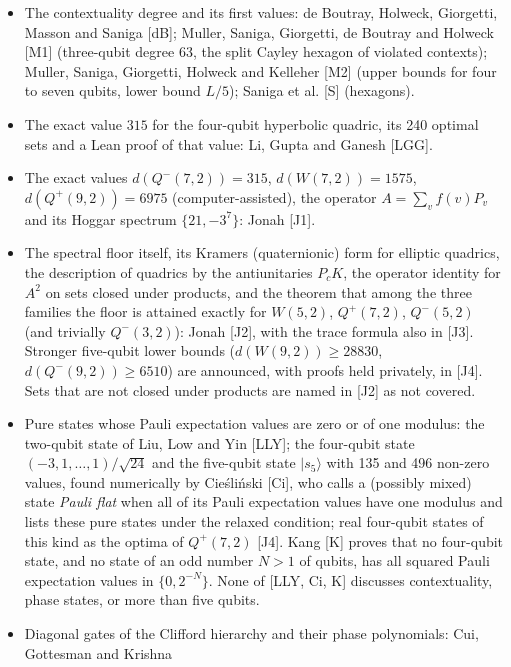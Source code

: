 \documentclass[11pt,a4paper]{article}
\providecommand{\tightlist}{\setlength{\itemsep}{0pt}\setlength{\parskip}{0pt}}
\newcommand{\gt}{>}
\begin{document}
\begin{itemize}
\tightlist
\item
  The contextuality degree and its first values: de Boutray, Holweck, Giorgetti, Masson and Saniga
  {[}dB{]}; Muller, Saniga, Giorgetti, de Boutray and Holweck {[}M1{]} (three-qubit degree 63, the split Cayley
  hexagon of violated contexts); Muller, Saniga, Giorgetti, Holweck and Kelleher {[}M2{]} (upper bounds
  for four to seven qubits, lower bound \(L/5\)); Saniga et al. {[}S{]} (hexagons).
\item
  The exact value \(315\) for the four-qubit hyperbolic quadric, its 240 optimal sets and a Lean proof of
  that value: Li, Gupta and Ganesh {[}LGG{]}.
\item
  The exact values \(d(Q^-(7,2)) = 315\), \(d(W(7,2)) = 1575\), \(d(Q^+(9,2)) = 6975\) (computer-assisted),
  the operator \(A = \sum_v f(v) P_v\) and its Hoggar spectrum \(\{21, -3^7\}\): Jonah {[}J1{]}.
\item
  The spectral floor itself, its Kramers (quaternionic) form for elliptic quadrics, the description of
  quadrics by the antiunitaries \(P_c K\), the operator identity for \(A^2\) on sets closed under products,
  and the theorem that among the three families the floor is attained exactly for
  \(W(5,2)\), \(Q^+(7,2)\), \(Q^-(5,2)\) (and trivially \(Q^-(3,2)\)): Jonah {[}J2{]}, with the trace formula also
  in {[}J3{]}. Stronger five-qubit lower bounds (\(d(W(9,2)) \ge 28830\), \(d(Q^-(9,2)) \ge 6510\)) are
  announced, with proofs held privately, in {[}J4{]}. Sets that are not closed under products are named in
  {[}J2{]} as not covered.
\item
  Pure states whose Pauli expectation values are zero or of one modulus: the two-qubit state of Liu, Low
  and Yin {[}LLY{]}; the four-qubit state \((-3,1,\dots,1)/\sqrt{24}\) and the five-qubit state \(|s_5\rangle\)
  with 135 and 496 non-zero values, found numerically by Cieśliński {[}Ci{]}, who calls a (possibly mixed)
  state \emph{Pauli flat} when all of its Pauli expectation values have one modulus and lists these pure
  states under the relaxed condition; real four-qubit states of this kind as the optima of \(Q^+(7,2)\)
  {[}J4{]}. Kang {[}K{]} proves that no four-qubit state, and no state of an odd number \(N \gt 1\) of qubits, has
  all squared Pauli expectation values in \(\{0, 2^{-N}\}\). None of {[}LLY, Ci, K{]} discusses contextuality,
  phase states, or more than five qubits.
\item
  Diagonal gates of the Clifford hierarchy and their phase polynomials: Cui, Gottesman and Krishna

\end{itemize}
\end{document}
